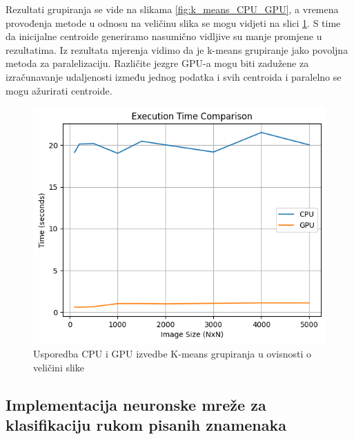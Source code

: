 \documentclass[a4paper,twocolumn]{article}
\begin{document}
        Rezultati grupiranja se vide na slikama \ref{fig:k_means_CPU_GPU}, a vremena provođenja metode u odnosu na veličinu slika se mogu vidjeti na slici \ref{fig:k_means_timing}. S time da inicijalne centroide generiramo nasumično vidljive su manje promjene u rezultatima. Iz rezultata mjerenja vidimo da je k-means grupiranje jako povoljna metoda za paralelizaciju. Različite jezgre GPU-a mogu biti zadužene za izračunavanje udaljenosti između jednog podatka i svih centroida i paralelno se mogu ažurirati centroide.
        
        \begin{figure}[H]
        	\centering
        	\includegraphics[width=1\linewidth]{slike/k_means_timing.png} 
        	\caption{Usporedba CPU i GPU izvedbe K-means grupiranja u ovisnosti o veličini slike}
        	\label{fig:k_means_timing}
        \end{figure}
	
	\subsection{Implementacija neuronske mreže za klasifikaciju rukom pisanih znamenaka}
\end{document}

